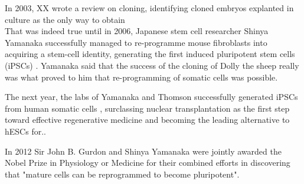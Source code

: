In 2003, XX wrote a review on cloning, identifying cloned embryos explanted in culture as the only way to obtain \\

That was indeed true until in 2006, Japanese stem cell researcher Shinya Yamanaka successfully managed to re-programme mouse fibroblasts into acquiring a stem-cell identity, generating the first induced pluripotent stem cells (iPSCs) \cite{takahashi2006induction}.
Yamanaka said that the success of the cloning of Dolly the sheep really was what proved to him that re-programming of somatic cells was possible.

The next year, the labs of Yamanaka and Thomson successfully generated iPSCs from human somatic cells \cite{takahashi2006induction, takahashi2007induction, yu2007induced}, surclassing nuclear transplantation as the first step toward effective regenerative medicine and becoming the leading alternative to hESCs for..

In 2012 Sir John B. Gurdon and Shinya Yamanaka were jointly awarded the Nobel Prize in Physiology or Medicine for their combined efforts in discovering that "mature cells can be reprogrammed to become pluripotent".    






